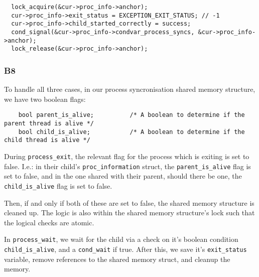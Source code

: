 \documentclass[a4wide, 11pt]{article}
\newcommand{\tx}{\texttt}
\begin{document}
\begin{verbatim}
  lock_acquire(&cur->proc_info->anchor);
  cur->proc_info->exit_status = EXCEPTION_EXIT_STATUS; // -1
  cur->proc_info->child_started_correctly = success;
  cond_signal(&cur->proc_info->condvar_process_syncs, &cur->proc_info->anchor);
  lock_release(&cur->proc_info->anchor);
\end{verbatim}

\subsubsection{B8}

To handle all three cases, in our process syncronisation shared memory structure, we have two boolean flags:

\begin{verbatim}
    bool parent_is_alive;          /* A boolean to determine if the parent thread is alive */
    bool child_is_alive;           /* A boolean to determine if the child thread is alive */
\end{verbatim}

During \tx{process\_exit}, the relevant flag for the process which is exiting is set to false. I.e.: in their child's \tx{proc\_information} struct, the \tx{parent\_is\_alive} flag is set to false, and in the one shared with their parent, should there be one, the \tx{child\_is\_alive} flag is set to false.

Then, if and only if both of these are set to false, the shared memory structure is cleaned up. The logic is also within the shared memory structure's lock such that the logical checks are atomic.

In \tx{process\_wait}, we wait for the child via a check on it's boolean condition \texttt{child\_is\_alive}, and a \texttt{cond\_wait} if true. After this, we save it's \texttt{exit\_status} variable, remove references to the shared memory struct, and cleanup the memory.
\end{document}
